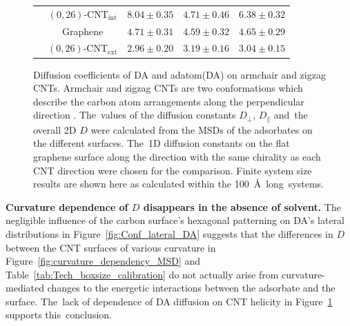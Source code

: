\documentclass[molecules,article,accept,pdftex,moreauthors]{Definitions/mdpi}
\begin{document}
\begin{figure}[H]
\begin{tabular}{cc|cc|c}
                                    \cmidrule{2-5}
                                    &   $(0,26)$-CNT$_\mathrm{int}$ &   $8.04   \pm 0.35$   &   $4.71   \pm 0.46$   &   $6.38   \pm 0.32$ \\
                                    &   Graphene              &  $4.71   \pm 0.31$   &  $4.59   \pm 0.32$   &    $4.65   \pm 0.29$ \\
                                    &   $(0,26)$-CNT$_\mathrm{ext}$ &   $2.96   \pm 0.20$   &   $3.19   \pm 0.16$   &   $3.04   \pm 0.15$ \\
        \bottomrule
    \end{tabular}
    \caption{Diffusion coefficients of DA and adatom(DA) on armchair and zigzag CNTs. Armchair and zigzag CNTs are two conformations which describe the carbon atom arrangements along the perpendicular direction%
. The~values of the diffusion constants $D_{\perp}$, $D_{\parallel}$ and~the overall 2D $D$ were calculated from the MSDs of the adsorbates on the different surfaces. The~1D diffusion constants on the flat graphene surface along the direction with the same chirality as each CNT direction were chosen for the comparison. Finite system size results are shown here as calculated within the 100~\AA\ long~systems.} 
    \label{fig:armchair-zigzag}
\end{figure}



{\bf Curvature dependence of $D$ disappears in the absence of solvent.}  %
The negligible influence of the carbon surface's hexagonal patterning on DA's lateral distributions in Figure~\ref{fig:Conf_lateral_DA} suggests that the differences in $D$ between the CNT surfaces of various curvature in Figure~\ref{fig:curvature_dependency_MSD} and Table~\ref{tab:Tech_boxsize_calibration} do not actually arise from curvature-mediated changes to the energetic interactions between the adsorbate and the surface. The~lack of dependence of DA diffusion on CNT helicity in Figure~\ref{fig:armchair-zigzag} supports this~conclusion.  
         
\end{document}
